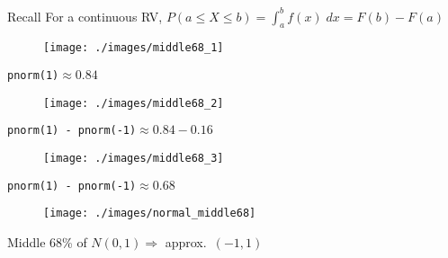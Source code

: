 \begin{frame}[fragile]

  \begin{alertblock}{Recall}
    For a continuous RV, $\displaystyle P(a \leq X \leq b) = \int_{a}^b f(x)\; dx = F(b) - F(a)$
  \end{alertblock}


\end{frame}
\begin{frame}[t]

  \vspace{-3em}
\begin{figure}
\texttt{[image: ./images/middle68\_1]}
\end{figure}

\vspace{-1em}
\centering 
\texttt{pnorm(1)}$\approx 0.84$
\end{frame}
\begin{frame}[t,noframenumbering]
  \vspace{-3em}
\begin{figure}
\texttt{[image: ./images/middle68\_2]}
\end{figure}
\vspace{-1em}
\centering
\texttt{pnorm(1) - pnorm(-1)}$\approx 0.84 - 0.16$
\end{frame}
\begin{frame}[t,noframenumbering]
  \vspace{-3em}
\begin{figure}
\texttt{[image: ./images/middle68\_3]}
\end{figure}
\vspace{-1em}
\centering
\texttt{pnorm(1) - pnorm(-1)}$\approx 0.68$
\end{frame}
\begin{frame}[t,noframenumbering]
  \vspace{-3em}
\begin{figure}
\texttt{[image: ./images/normal\_middle68]}
\end{figure}
\vspace{-1em}
\centering
Middle 68\% of $N(0,1) \Rightarrow$ approx.\ $(-1,1)$
\end{frame}

